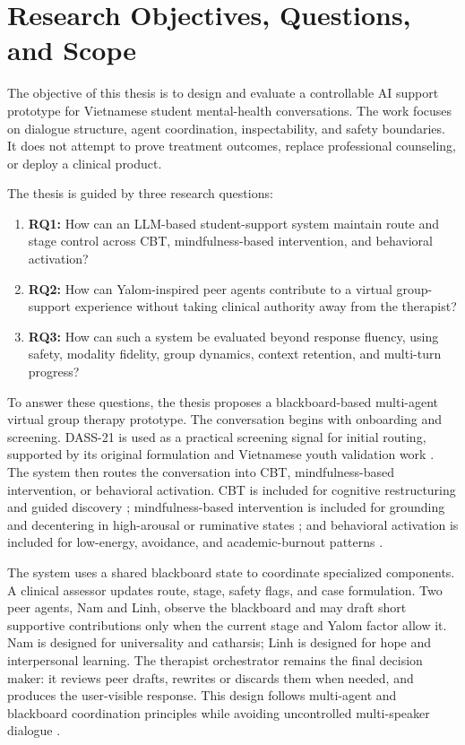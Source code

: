 \section{Research Objectives, Questions, and Scope}

The objective of this thesis is to design and evaluate a controllable AI support prototype for Vietnamese student mental-health conversations. The work focuses on dialogue structure, agent coordination, inspectability, and safety boundaries. It does not attempt to prove treatment outcomes, replace professional counseling, or deploy a clinical product.

The thesis is guided by three research questions:

\begin{enumerate}
    \item \textbf{RQ1:} How can an LLM-based student-support system maintain route and stage control across CBT, mindfulness-based intervention, and behavioral activation?
    \item \textbf{RQ2:} How can Yalom-inspired peer agents contribute to a virtual group-support experience without taking clinical authority away from the therapist?
    \item \textbf{RQ3:} How can such a system be evaluated beyond response fluency, using safety, modality fidelity, group dynamics, context retention, and multi-turn progress?
\end{enumerate}

To answer these questions, the thesis proposes a blackboard-based multi-agent virtual group therapy prototype. The conversation begins with onboarding and screening. DASS-21 is used as a practical screening signal for initial routing, supported by its original formulation and Vietnamese youth validation work \citep{Lovibond1995DASS,Le2017DASS21Vietnamese}. The system then routes the conversation into CBT, mindfulness-based intervention, or behavioral activation. CBT is included for cognitive restructuring and guided discovery \citep{Hofmann2012CBTMetaAnalyses}; mindfulness-based intervention is included for grounding and decentering in high-arousal or ruminative states \citep{Zenner2014MindfulnessSchools}; and behavioral activation is included for low-energy, avoidance, and academic-burnout patterns \citep{Mazzucchelli2010BehavioralActivation}.

The system uses a shared blackboard state to coordinate specialized components. A clinical assessor updates route, stage, safety flags, and case formulation. Two peer agents, Nam and Linh, observe the blackboard and may draft short supportive contributions only when the current stage and Yalom factor allow it. Nam is designed for universality and catharsis; Linh is designed for hope and interpersonal learning. The therapist orchestrator remains the final decision maker: it reviews peer drafts, rewrites or discards them when needed, and produces the user-visible response. This design follows multi-agent and blackboard coordination principles while avoiding uncontrolled multi-speaker dialogue \citep{Wu2023AutoGen,Salemi2025BlackboardSystem}.

